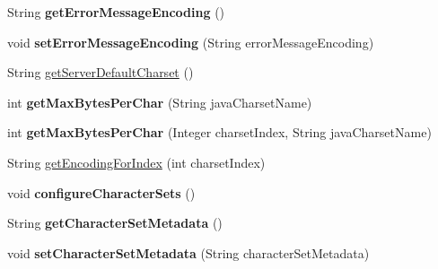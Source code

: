 \begin{DoxyCompactItemize}
String {\bfseries get\+Error\+Message\+Encoding} ()
\item 
\mbox{\label{classcom_1_1mysql_1_1cj_1_1protocol_1_1a_1_1_native_server_session_a394485ebd068b7fa0c9a0c7343fcd53c}} 
void {\bfseries set\+Error\+Message\+Encoding} (String error\+Message\+Encoding)
\item 
String \mbox{\hyperlink{classcom_1_1mysql_1_1cj_1_1protocol_1_1a_1_1_native_server_session_ad663008943ab8a1188490e3ba0befe95}{get\+Server\+Default\+Charset}} ()
\item 
\mbox{\label{classcom_1_1mysql_1_1cj_1_1protocol_1_1a_1_1_native_server_session_ad7465b48803efa279712a08e64bb4cd1}} 
int {\bfseries get\+Max\+Bytes\+Per\+Char} (String java\+Charset\+Name)
\item 
\mbox{\label{classcom_1_1mysql_1_1cj_1_1protocol_1_1a_1_1_native_server_session_af9ca6638e8879ecf64d7a09eb70420d4}} 
int {\bfseries get\+Max\+Bytes\+Per\+Char} (Integer charset\+Index, String java\+Charset\+Name)
\item 
String \mbox{\hyperlink{classcom_1_1mysql_1_1cj_1_1protocol_1_1a_1_1_native_server_session_a3a9d807f5e66892f234d06934d275de1}{get\+Encoding\+For\+Index}} (int charset\+Index)
\item 
\mbox{\label{classcom_1_1mysql_1_1cj_1_1protocol_1_1a_1_1_native_server_session_afb85710d7264a784f27133cec2eaf811}} 
void {\bfseries configure\+Character\+Sets} ()
\item 
\mbox{\label{classcom_1_1mysql_1_1cj_1_1protocol_1_1a_1_1_native_server_session_ae60251435377bb750534dd50526e06bb}} 
String {\bfseries get\+Character\+Set\+Metadata} ()
\item 
\mbox{\label{classcom_1_1mysql_1_1cj_1_1protocol_1_1a_1_1_native_server_session_a3820f7525abbc47c614a2f1ffa794475}} 
void {\bfseries set\+Character\+Set\+Metadata} (String character\+Set\+Metadata)
\item 

\end{DoxyCompactItemize}
